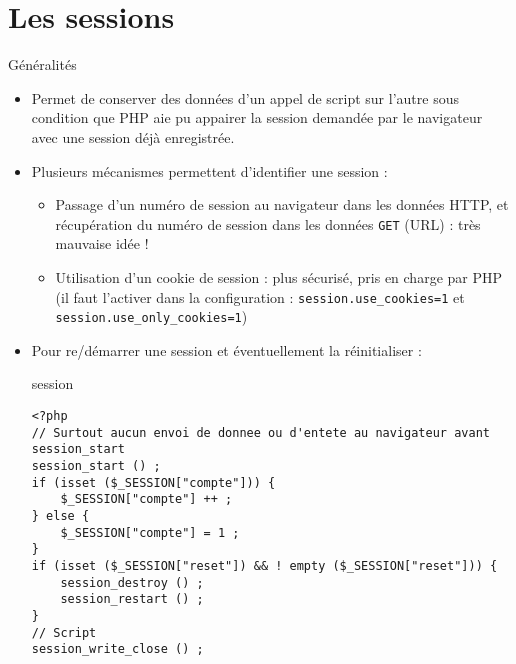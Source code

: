 
\section{Les sessions}

\begin{frame}[containsverbatim]{Généralités}
	\begin{itemize}
		\item Permet de conserver des données d’un appel de script sur l’autre sous condition que PHP aie pu appairer la session demandée par le navigateur avec une session déjà enregistrée.
		\item Plusieurs mécanismes permettent d’identifier une session :
		\begin{itemize}
			\item Passage d’un numéro de session au navigateur dans les données HTTP, et récupération du numéro de session dans les données \texttt{GET} (URL) : très mauvaise idée !
			\item Utilisation d’un cookie de session : plus sécurisé, pris en charge par PHP (il faut l’activer dans la configuration : \texttt{session.use\_cookies=1} et \texttt{session.use\_only\_cookies=1})
		\end{itemize}
		\item Pour re/démarrer une session et éventuellement la réinitialiser :
		\begin{block}{session}
			\begin{lstlisting}
<?php
// Surtout aucun envoi de donnee ou d'entete au navigateur avant session_start
session_start () ;
if (isset ($_SESSION["compte"])) {
	$_SESSION["compte"] ++ ;
} else {
	$_SESSION["compte"] = 1 ;
}
if (isset ($_SESSION["reset"]) && ! empty ($_SESSION["reset"])) {
	session_destroy () ;
	session_restart () ;
}
// Script
session_write_close () ;
			\end{lstlisting}
		\end{block}
	\end{itemize}
\end{frame}
